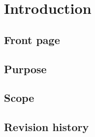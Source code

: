 \chapter{Introduction}


\section{Front page}

\section{Purpose}

\section{Scope}

\section{Revision history}